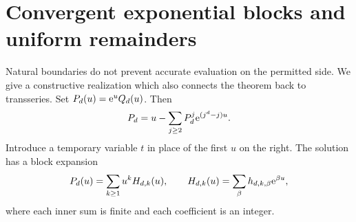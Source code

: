 \documentclass[11pt,a4paper]{article}
\numberwithin{equation}{section}
\theoremstyle{definition}\newtheorem{definition}[theorem]{Definition}
\theoremstyle{remark}\newtheorem{remark}[theorem]{Remark}
\theoremstyle{definition}
\begin{document}
\section{Convergent exponential blocks and uniform remainders}
\label{sec:blocks}
Natural boundaries do not prevent accurate evaluation on the permitted side.
We give a constructive realization which also connects the theorem back to
transseries. Set $P_d(u)=\mathrm e^uQ_d(u)$. Then
\begin{equation}
 P_d=u-\sum_{j\ge2}P_d^j\mathrm e^{(j^d-j)u}.
 \label{eq:P}
\end{equation}
Introduce a temporary variable $t$ in place of the first $u$ on the right.
The solution has a block expansion
\begin{equation}
 P_d(u)=\sum_{k\ge1}u^k H_{d,k}(u),
 \qquad H_{d,k}(u)=\sum_\beta h_{d,k,\beta}\mathrm e^{\beta u},
 \label{eq:blocks}
\end{equation}
where each inner sum is finite and each coefficient is an integer.
\end{document}
